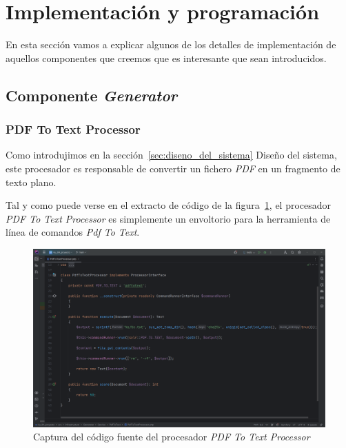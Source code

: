 \section{Implementación y programación}\label{sec:implemetacion_y_programacion}

En esta sección vamos a explicar algunos de los detalles de implementación de aquellos componentes que creemos que es
interesante que sean introducidos.

\subsection*{Componente \textit{Generator}}

\subsubsection*{PDF To Text Processor}

Como introdujimos en la sección~\ref{sec:diseno_del_sistema} Diseño del sistema, este procesador es responsable de
convertir un fichero \textit{PDF} en un fragmento de texto plano.

Tal y como puede verse en el extracto de código de la figura~\ref{fig:chapter_4.4.pdf_to_text_processor}, el procesador
\textit{PDF To Text Processor} es simplemente un envoltorio para la herramienta de línea de comandos
\textit{Pdf To Text}.

\begin{figure}[ht]
    \begin{center}
        \includegraphics[width=\textwidth]{./chapter/4/images/chapter_4.4.pdf_to_text_processor}
        \caption{Captura del código fuente del procesador \textit{PDF To Text Processor}}
        \label{fig:chapter_4.4.pdf_to_text_processor}
    \end{center}
\end{figure}

